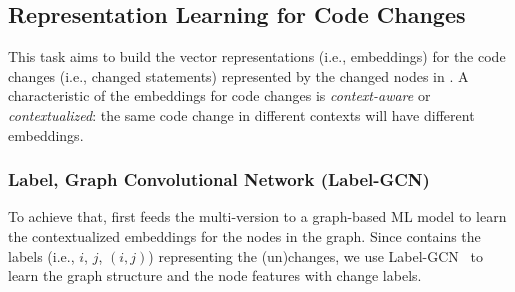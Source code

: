 \subsection{Representation Learning for Code Changes}
\label{vector:sec}



This task aims to build the vector representations (i.e.,
embeddings) for the code changes (i.e., changed statements)
represented by the changed nodes in {\mvpdg}. A characteristic of the
embeddings for code changes is {\em context-aware} or {\em
  contextualized}: the same code change in different contexts
will have different embeddings.


\subsubsection{Label, Graph Convolutional Network (Label-GCN)}

To achieve that, {\tool} first feeds the multi-version {\mvpdg} to a
graph-based ML model to learn the contextualized
embeddings for the nodes in the graph. Since {\mvpdg} contains the
labels (i.e., $i$, $j$, $(i,j)$) representing the (un)changes,
we use Label-GCN~\cite{label-gcn} to learn the graph structure and
the node features with change labels.




